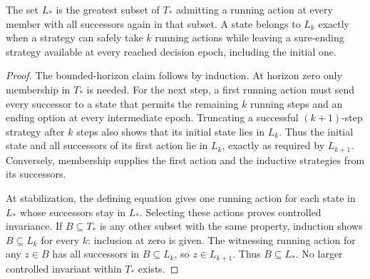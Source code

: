 \begin{lemma}\label{r:running-invariant}
The set $L_*$ is the greatest subset of $T_*$ admitting a running action at every member with all successors again in that subset. A state belongs to $L_k$ exactly when a strategy can safely take $k$ running actions while leaving a sure-ending strategy available at every reached decision epoch, including the initial one.
\end{lemma}
\begin{proof}
The bounded-horizon claim follows by induction. At horizon zero only membership in $T_*$ is needed. For the next step, a first running action must send every successor to a state that permits the remaining $k$ running steps and an ending option at every intermediate epoch. Truncating a successful $(k+1)$-step strategy after $k$ steps also shows that its initial state lies in $L_k$. Thus the initial state and all successors of its first action lie in $L_k$, exactly as required by $L_{k+1}$. Conversely, membership supplies the first action and the inductive strategies from its successors.

At stabilization, the defining equation gives one running action for each state in $L_*$ whose successors stay in $L_*$. Selecting these actions proves controlled invariance. If $B\subseteq T_*$ is any other subset with the same property, induction shows $B\subseteq L_k$ for every $k$: inclusion at zero is given. The witnessing running action for any $z\in B$ has all successors in $B\subseteq L_k$, so $z\in L_{k+1}$. Thus $B\subseteq L_*$. No larger controlled invariant within $T_*$ exists.
\end{proof}

